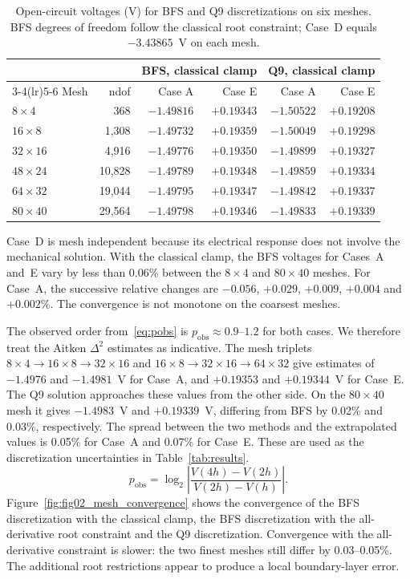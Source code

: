 \documentclass[a4paper,12pt]{elsarticle}
\begin{document}
\begin{table}[t]
\centering
\caption{Open-circuit voltages (V) for BFS and Q9 discretizations on six meshes. BFS degrees of freedom follow the classical root constraint; Case~D equals $-3.43865$~V on each mesh.}
\label{tab:mesh}
\small
\begin{tabular}{@{}lrrrrr@{}}
\toprule
 & & \multicolumn{2}{c}{BFS, classical clamp} & \multicolumn{2}{c}{Q9, classical clamp}\\
\cmidrule(lr){3-4}\cmidrule(lr){5-6}
Mesh & ndof & Case A & Case E & Case A & Case E \\
\midrule
$8\times4$ & 368 & $-1.49816$ & $+0.19343$ & $-1.50522$ & $+0.19208$ \\
$16\times8$ & 1{,}308 & $-1.49732$ & $+0.19359$ & $-1.50049$ & $+0.19298$ \\
$32\times16$ & 4{,}916 & $-1.49776$ & $+0.19350$ & $-1.49899$ & $+0.19327$ \\
$48\times24$ & 10{,}828 & $-1.49789$ & $+0.19348$ & $-1.49859$ & $+0.19334$ \\
$64\times32$ & 19{,}044 & $-1.49795$ & $+0.19347$ & $-1.49842$ & $+0.19337$ \\
$80\times40$ & 29{,}564 & $-1.49798$ & $+0.19346$ & $-1.49833$ & $+0.19339$ \\
\bottomrule
\end{tabular}
\end{table}

Case~D is mesh independent because its electrical response does not
involve the mechanical solution. With the classical clamp, the BFS
voltages for Cases~A and~E vary by less than 0.06\% between the
$8\times4$ and $80\times40$ meshes. For Case~A, the successive
relative changes are $-0.056$, $+0.029$, $+0.009$, $+0.004$ and
$+0.002$\%. The convergence is not monotone on the coarsest meshes.

The observed order from~\eqref{eq:pobs} is
$p_{\mathrm{obs}}\approx0.9$--$1.2$ for both cases. We therefore
treat the Aitken $\Delta^2$ estimates as indicative. The mesh
triplets $8\times4\to16\times8\to32\times16$ and
$16\times8\to32\times16\to64\times32$ give estimates of
$-1.4976$ and $-1.4981$~V for Case~A, and $+0.19353$ and
$+0.19344$~V for Case~E. The Q9 solution approaches these values
from the other side. On the $80\times40$ mesh it gives
$-1.4983$~V and $+0.19339$~V, differing from BFS by 0.02\%
and 0.03\%, respectively. The spread between the two methods and
the extrapolated values is 0.05\% for Case~A and 0.07\% for
Case~E. These are used as the discretization uncertainties in
Table~\ref{tab:results}.
\begin{equation}
p_{\mathrm{obs}}
=\log_2\left|\frac{V(4h)-V(2h)}{V(2h)-V(h)}\right|.
\label{eq:pobs}
\end{equation}
Figure~\ref{fig:fig02_mesh_convergence} shows the convergence of the BFS discretization with the classical clamp, the BFS discretization with the all-derivative root constraint and the Q9 discretization. Convergence with the all-derivative constraint is slower: the two finest meshes
still differ by 0.03--0.05\%. The additional root restrictions appear to
produce a local boundary-layer error.
\end{document}
